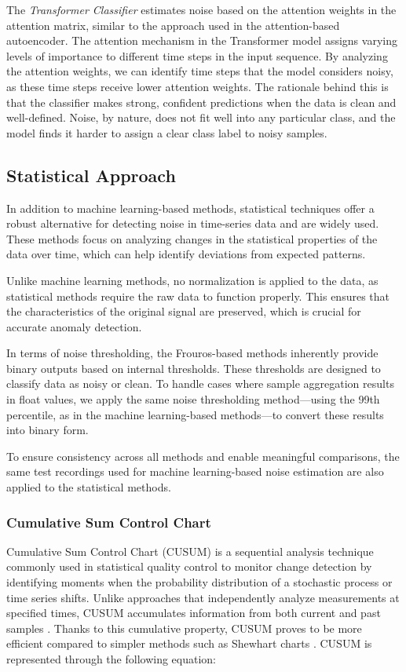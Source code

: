 The \emph{Transformer Classifier} estimates noise based on the attention weights in the attention matrix, similar to the approach used in the attention-based autoencoder. The attention mechanism in the Transformer model assigns varying levels of importance to different time steps in the input sequence. By analyzing the attention weights, we can identify time steps that the model considers noisy, as these time steps receive lower attention weights. The rationale behind this is that the classifier makes strong, confident predictions when the data is clean and well-defined. Noise, by nature, does not fit well into any particular class, and the model finds it harder to assign a clear class label to noisy samples.

\subsection{Statistical Approach}

In addition to machine learning-based methods, statistical techniques offer a robust alternative for detecting noise in time-series data and are widely used. These methods focus on analyzing changes in the statistical properties of the data over time, which can help identify deviations from expected patterns.

Unlike machine learning methods, no normalization is applied to the data, as statistical methods require the raw data to function properly. This ensures that the characteristics of the original signal are preserved, which is crucial for accurate anomaly detection.

In terms of noise thresholding, the Frouros-based methods inherently provide binary outputs based on internal thresholds. These thresholds are designed to classify data as noisy or clean. To handle cases where sample aggregation results in float values, we apply the same noise thresholding method—using the 99th percentile, as in the machine learning-based methods—to convert these results into binary form.

To ensure consistency across all methods and enable meaningful comparisons, the same test recordings used for machine learning-based noise estimation are also applied to the statistical methods.

\subsubsection{Cumulative Sum Control Chart}
Cumulative Sum Control Chart (CUSUM) is a sequential analysis technique commonly used in statistical quality control to monitor change detection \cite{basseville1993detection} by identifying moments when the probability distribution of a stochastic process or time series shifts. Unlike approaches that independently analyze measurements at specified times, CUSUM accumulates information from both current and past samples \cite{ncss2024}. Thanks to this cumulative property, CUSUM proves to be more efficient \cite{nelson1984shewhart} compared to simpler methods such as Shewhart charts \cite{koshti2011cusum}.
CUSUM is represented through the following equation:

